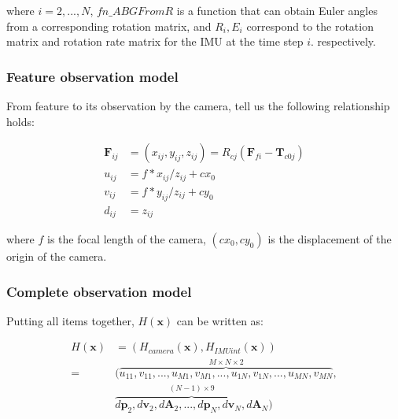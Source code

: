 \documentclass[12pt]{article}   %
\begin{document}
where $i = 2,..., N$, $fn\_ABGFromR$ is a function that can obtain Euler angles from a corresponding rotation matrix, and $R_i, E_i$ correspond to the rotation matrix and rotation rate matrix for the IMU at the time step $i$. respectively.

\subsubsection{Feature observation model}
From feature to its observation by the camera, \cite{multipleViewGeometry} tell us the following relationship holds:

\begin{align}
\textbf{F}_{ij} &= (x_{ij}, y_{ij}, z_{ij}) = R_{cj} (\textbf{F}_{fi} - \textbf{T}_{c0j}) \label{formu:pij} \\
u_{ij} &= f * x_{ij} / z_{ij} + cx_0 \label{formu:uij} \\
v_{ij} &= f * y_{ij} / z_{ij} + cy_0 \label{formu:vij} \\
d_{ij} &= z_{ij} \label{formu:dij}
\end{align}

where $f$ is the focal length of the camera, $(cx_0, cy_0)$ is the displacement of the origin of the camera.

\subsubsection{Complete observation model}
Putting all items together, $H(\textbf{x})$ can be written as:

\begin{align} %
H(\textbf{x}) &= (H_{camera}(\textbf{x}), H_{IMUint}(\textbf{x})) \nonumber \\
=& (\overbrace{{u}_{11}, {v}_{11}, ... , {u}_{M1}, {v}_{M1}, ..., {u}_{1N}, {v}_{1N}, ... , {u}_{MN}, {v}_{MN}}^{M \times N \times 2}, \nonumber \nonumber \\ 
& \overbrace{d\textbf{p}_{2}, d\textbf{v}_{2}, d\textbf{A}_{2}, ... , d\textbf{p}_{N}, d\textbf{v}_{N}, d\textbf{A}_{N}}^{(N-1) \times 9}) 
\end{align}
\end{document}
